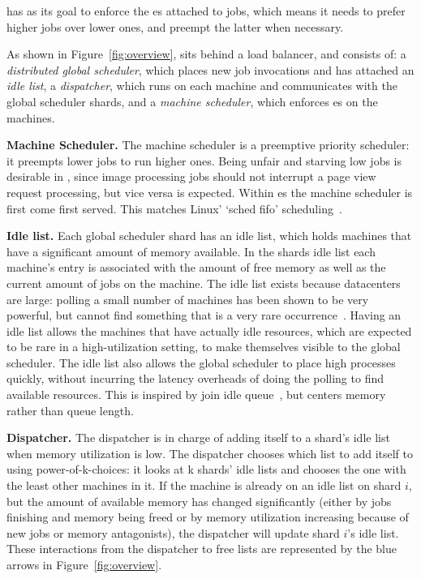\Sys{} has as its goal to enforce the \class{}es attached to jobs, which means
it needs to prefer higher \class{} jobs over lower ones, and preempt the latter
when necessary.
  

As shown in Figure~\ref{fig:overview}, \sys{} sits behind a load balancer, and
consists of: a \textit{distributed global scheduler}, which places new job
invocations and has attached an \textit{idle list}, a \textit{dispatcher},
which runs on each machine and communicates with the global scheduler shards,
and a \textit{machine scheduler}, which enforces \class{}es on the machines.


\textbf{Machine Scheduler.}
The machine scheduler is a preemptive priority scheduler: it preempts lower
\class{} jobs to run higher \class{} ones. Being unfair and starving low
\class{} jobs is desirable in \sys{}, since image processing jobs should not
interrupt a page view request processing, but vice versa is expected. Within
\class{}es the machine scheduler is first come first served. This matches Linux'
`sched fifo' scheduling~\cite{linux-sched}.


\textbf{Idle list.}
Each global scheduler shard has an idle list, which holds machines that have a
significant amount of memory available. In the shards idle list each machine's
entry is associated with the amount of free memory as well as the current amount
of jobs on the machine. The idle list exists because datacenters are large:
polling a small number of machines has been shown to be very powerful, but
cannot find something that is a very rare occurrence~\cite{join-idle-queue}.
Having an idle list allows the machines that have actually idle resources, which
are expected to be rare in a high-utilization setting, to make themselves
visible to the global scheduler. The idle list also allows the global scheduler
to place high \class{} processes quickly, without incurring the latency
overheads of doing the polling to find available resources. This is inspired by
join idle queue~\cite{join-idle-queue}, but centers memory rather than queue
length.


\textbf{Dispatcher.}
The dispatcher is in charge of adding itself to a shard's idle list when memory
utilization is low. The dispatcher chooses which list to add itself to using
power-of-k-choices: it looks at k shards' idle lists and chooses the one with
the least other machines in it. If the machine is already on an idle list on
shard $i$, but the amount of available memory has changed significantly (either
by jobs finishing and memory being freed or by memory utilization increasing
because of new jobs or memory antagonists), the dispatcher will update shard
$i$'s idle list. These interactions from the dispatcher to free lists are
represented by the blue arrows in Figure~\ref{fig:overview}.

